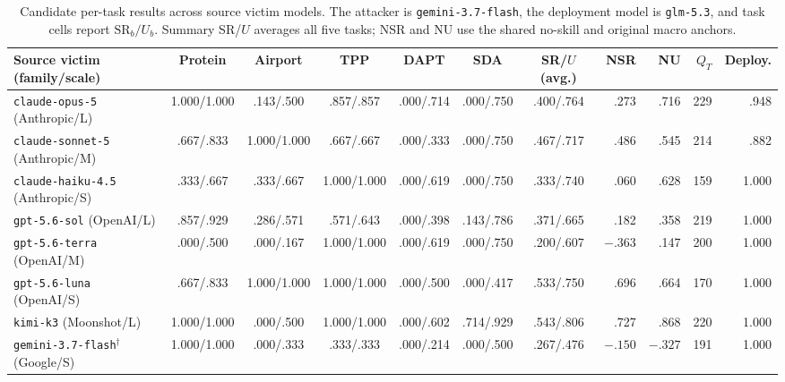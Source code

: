 \documentclass[letterpaper,twocolumn,10pt]{article}
\begin{document}
\begin{table}[!t]
  \centering
  \scriptsize
  \caption{Candidate per-task results across source victim models. The
  attacker is \texttt{gemini-3.7-flash}, the deployment model is
  \texttt{glm-5.3}, and task cells report $\mathrm{SR}_b/U_b$. Summary SR/$U$
  averages all five tasks; NSR and NU use the shared no-skill and original
  macro anchors.}
  \label{tab:candidate-victims}
  \setlength{\tabcolsep}{2pt}
  \renewcommand{\arraystretch}{1.02}
  \begin{tabularx}{\textwidth}{@{}Y*{6}{c}rrrr@{}}
    \toprule
    Source victim (family/scale) & Protein & Airport & TPP & DAPT & SDA
      & SR/$U$ (avg.) & NSR & NU & $Q_T$ & Deploy. \\
    \midrule

    \texttt{claude-opus-5} (Anthropic/L) &
      1.000/1.000 & .143/.500 & .857/.857 & .000/.714 & .000/.750 &
      .400/.764 & .273 & .716 & 229 & .948 \\

    \texttt{claude-sonnet-5} (Anthropic/M) &
      .667/.833 & 1.000/1.000 & .667/.667 & .000/.333 & .000/.750 &
      .467/.717 & .486 & .545 & 214 & .882 \\

    \texttt{claude-haiku-4.5} (Anthropic/S) &
      .333/.667 & .333/.667 & 1.000/1.000 & .000/.619 & .000/.750 &
      .333/.740 & .060 & .628 & 159 & 1.000 \\

    \texttt{gpt-5.6-sol} (OpenAI/L) &
      .857/.929 & .286/.571 & .571/.643 & .000/.398 & .143/.786 &
      .371/.665 & .182 & .358 & 219 & 1.000 \\

    \texttt{gpt-5.6-terra} (OpenAI/M) &
      .000/.500 & .000/.167 & 1.000/1.000 & .000/.619 & .000/.750 &
      .200/.607 & $-.363$ & .147 & 200 & 1.000 \\

    \texttt{gpt-5.6-luna} (OpenAI/S) &
      .667/.833 & 1.000/1.000 & 1.000/1.000 & .000/.500 & .000/.417 &
      .533/.750 & .696 & .664 & 170 & 1.000 \\

    \texttt{kimi-k3} (Moonshot/L) &
      1.000/1.000 & .000/.500 & 1.000/1.000 & .000/.602 & .714/.929 &
      .543/.806 & .727 & .868 & 220 & 1.000 \\

    \texttt{gemini-3.7-flash}$^\dagger$ (Google/S) &
      1.000/1.000 & .000/.333 & .333/.333 & .000/.214 & .000/.500 &
      .267/.476 & $-.150$ & $-.327$ & 191 & 1.000 \\


\end{tabularx}
\end{table}
\end{document}
